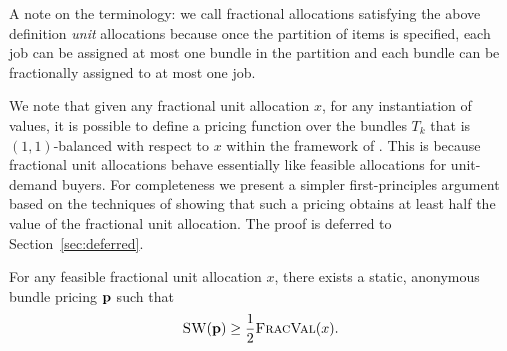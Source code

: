 A note on the terminology: we call fractional allocations satisfying
the above definition {\em unit} allocations because once the partition
of items is specified, each job can be assigned at most one bundle in
the partition and each bundle can be fractionally assigned to at most
one job. %

We note that given any fractional unit allocation $x$, for any
instantiation of values, it is possible to define a pricing function
over the bundles $T_k$ that is $(1,1)$-balanced with respect to $x$
within the framework of \cite{DFKL-17}. This is because fractional unit
allocations behave essentially like feasible allocations for
unit-demand buyers. For completeness we present a simpler
first-principles argument based on the techniques of \citet{FGL15}
showing that such a pricing obtains at least half the value of the
fractional unit allocation. The proof is deferred to
Section~\ref{sec:deferred}.

\begin{lemma}
    \label{lem:FGL}
    For any feasible fractional unit allocation $x$, there exists a static,
    anonymous bundle pricing $\mathbf{p}$ such that
    \[
        {\normalfont\textsc{SW}}(\mathbf{p}) \ge \frac12 {\normalfont\textsc{FracVal}}(x).
    \]
\end{lemma}

